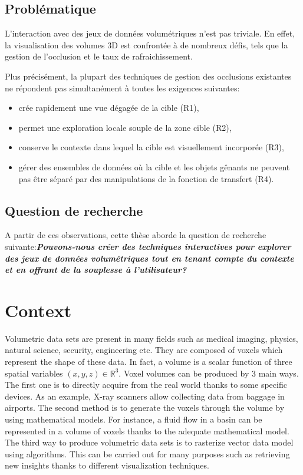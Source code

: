 \subsection{Problématique}
L'interaction avec des jeux de données volumétriques n'est pas triviale. En effet, la visualisation des volumes 3D est confrontée à de nombreux défis, tels que la gestion de l'occlusion et le taux de rafraichissement.


Plus précisément, la plupart des techniques de gestion des occlusions existantes ne répondent pas simultanément à toutes les exigences suivantes:
\begin{itemize}
\item crée rapidement une vue dégagée de la cible (R1),
\item permet une exploration locale souple de la zone cible (R2),
\item conserve le contexte dans lequel la cible est visuellement incorporée (R3),
\item gérer des ensembles de données où la cible et les objets gênants ne peuvent pas être séparé par des manipulations de la fonction de transfert (R4).
\end{itemize}

\subsection{ Question de recherche }

A partir de ces observations, cette thèse aborde la question de recherche suivante:\textbf{\textit{Pouvons-nous créer des techniques interactives pour explorer des jeux de données volumétriques tout en tenant compte du contexte et en offrant de la souplesse à l'utilisateur? }}
\NewPage


\section{Context}

Volumetric data sets are present in many fields such as medical imaging, physics, natural science, security, engineering etc. They are composed of voxels which represent the shape of these data. In fact, a volume is a scalar function of three spatial variables $(x,y,z) \in \mathbb{R}^3$. Voxel volumes can be produced by 3 main ways. The first one is to directly acquire from the real world thanks to some specific devices. As an example, X-ray scanners allow collecting data from baggage in airports. The second method is to generate the voxels through the volume by using mathematical models. For instance, a fluid flow in a basin can be represented in a volume of voxels thanks to the adequate mathematical model. The third way to produce volumetric data sets is to rasterize vector data model using algorithms. This can be carried out for many purposes such as retrieving new insights thanks to different visualization techniques.


